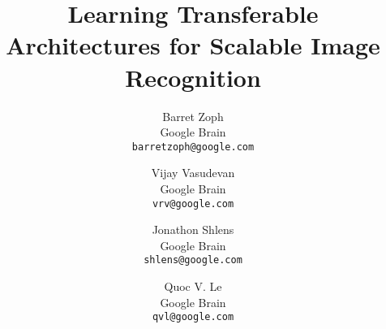 \documentclass[10pt,twocolumn,letterpaper]{article}
\begin{document}
\title{Learning Transferable Architectures for Scalable Image Recognition}

\author{Barret Zoph\\
Google Brain\\
{\tt\small barretzoph@google.com}
\and
Vijay Vasudevan\\
Google Brain\\
{\tt\small vrv@google.com}
\and
Jonathon Shlens\\
Google Brain\\
{\tt\small shlens@google.com}
\and
Quoc V. Le\\
Google Brain\\
{\tt\small qvl@google.com}
}

\maketitle
\end{document}
